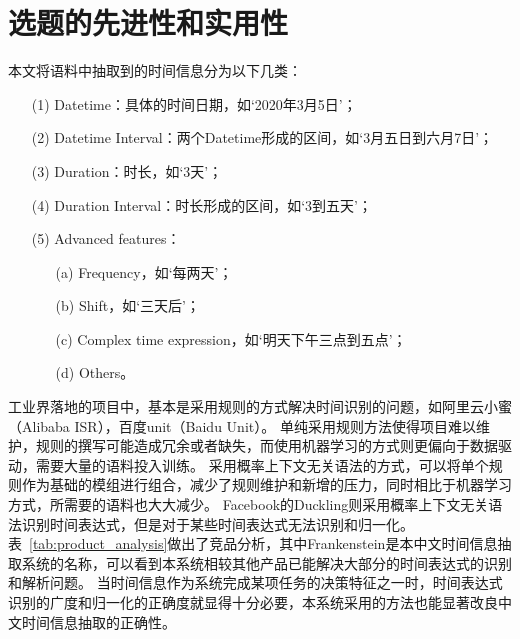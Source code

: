\section{选题的先进性和实用性}

本文将语料中抽取到的时间信息分为以下几类：
\begin{enumerate}
    \item[(1)]  Datetime：具体的时间日期，如‘2020年3月5日’；
    \item[(2)]  Datetime Interval：两个Datetime形成的区间，如‘3月五日到六月7日’；
    \item[(3)]  Duration：时长，如‘3天’；
    \item[(4)]  Duration Interval：时长形成的区间，如‘3到五天’；
    \item[(5)]  Advanced features：
        \begin{enumerate}
            \item[(a)] Frequency，如‘每两天’；
            \item[(b)] Shift，如‘三天后’；
            \item[(c)] Complex time expression，如‘明天下午三点到五点’；
            \item[(d)] Others。
        \end{enumerate}
\end{enumerate}

工业界落地的项目中，基本是采用规则的方式解决时间识别的问题，如阿里云小蜜（Alibaba ISR），百度unit（Baidu Unit）。
单纯采用规则方法使得项目难以维护，规则的撰写可能造成冗余或者缺失，而使用机器学习的方式则更偏向于数据驱动，需要大量的语料投入训练。
采用概率上下文无关语法的方式，可以将单个规则作为基础的模组进行组合，减少了规则维护和新增的压力，同时相比于机器学习方式，所需要的语料也大大减少。
Facebook的Duckling则采用概率上下文无关语法识别时间表达式，但是对于某些时间表达式无法识别和归一化。
表~\ref{tab:product_analysis}做出了竞品分析，其中Frankenstein是本中文时间信息抽取系统的名称，可以看到本系统相较其他产品已能解决大部分的时间表达式的识别和解析问题。
当时间信息作为系统完成某项任务的决策特征之一时，时间表达式识别的广度和归一化的正确度就显得十分必要，本系统采用的方法也能显著改良中文时间信息抽取的正确性。

